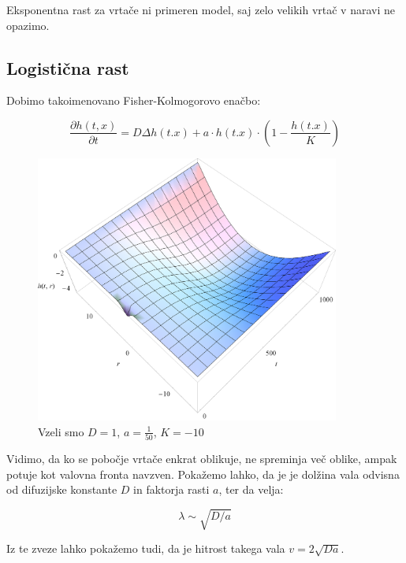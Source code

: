 \documentclass[a4paper, oneside, 12pt]{book}
\begin{document}
            Eksponentna rast za vrtače ni primeren model, saj zelo velikih vrtač v naravi ne opazimo.


          \subsection{Logistična rast}

            Dobimo takoimenovano Fisher-Kolmogorovo enačbo:

            \begin{equation}
              \frac{ \partial h(t,x) }{ \partial t} = D \Delta h(t.x) + a \cdot h(t.x) \cdot (1 - \frac{h(t.x)}{K})
              \label{difuzija-logisticna-rast}
            \end{equation}

            \begin{figure}[H]
              \begin{center}
                \includegraphics[width=10cm]{slike/difuzija-logisticna-rast2}
              \end{center}
              \caption{Vzeli smo $D=1$, $a=\frac{1}{50}$, $K=-10$}
              \label{fig:difuzija-logisticna-rast}
            \end{figure}

            Vidimo, da ko se pobočje vrtače enkrat oblikuje, ne spreminja več oblike, ampak potuje kot valovna fronta navzven. Pokažemo lahko, da je je dolžina vala odvisna od difuzijske konstante $D$ in faktorja rasti $a$, ter da velja: 

           \[ \lambda \sim \sqrt{D/a} \]

          Iz te zveze lahko pokažemo tudi, da je hitrost takega vala $v = 2 \sqrt{D a}$.
\end{document}
